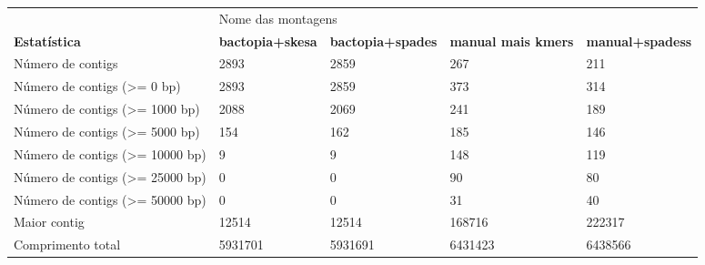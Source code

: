 \begin{table}[htb]
{\begin{tabular}{lllll}
		\toprule
		& \multicolumn{3}{l}{Nome das montagens}                                                                                                                       &                                 \\
		\cmidrule{2-5}
		\textbf{Estatística}                         & \textbf{bactopia+skesa} & \textbf{bactopia+spades} & \textbf{manual mais kmers} & \textbf{manual+spadess}\\
		\midrule
		Número de contigs                            & 2893                                   & 2859                                    & 267                               & 211                                         \\
		Número de contigs (\textgreater{}= 0 bp)     & 2893                                   & 2859                                    & 373                               & 314                                        \\
		Número de contigs (\textgreater{}= 1000 bp)  & 2088                                   & 2069                                    & 241                               & 189                                       \\
		Número de contigs (\textgreater{}= 5000 bp)  & 154                                    & 162                                     & 185                               & 146                                        \\
		Número de contigs (\textgreater{}= 10000 bp) & 9                                      & 9                                       & 148                               & 119                                        \\
		Número de contigs (\textgreater{}= 25000 bp) & 0                                      & 0                                       & 90                                & 80                                          \\
		Número de contigs (\textgreater{}= 50000 bp) & 0                                      & 0                                       & 31                                & 40                                       \\
		Maior contig                                 & 12514                                  & 12514                                   & 168716                            & 222317                                                           \\
		Comprimento total                            & 5931701                                & 5931691                                 & 6431423                           & 6438566                                                      \\

\end{tabular}}
\end{table}
